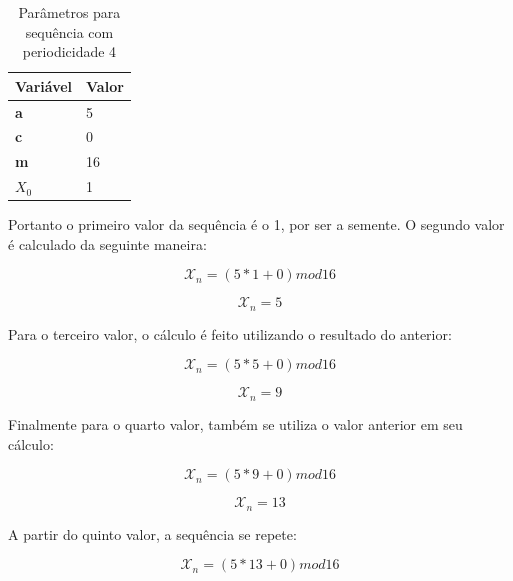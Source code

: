 \begin{table}[h]
	\centering
	\begin{tabular}{|l|l|}	
	\hline
		Variável & Valor \\ \hline
		\textbf{a} & 5 \\ \hline
		\textbf{c} & 0 \\ \hline
		\textbf{m} & 16 \\ \hline
		\textbf{$X_0$} & 1 \\ \hline
	\end{tabular}
	\caption{Parâmetros para sequência com periodicidade 4}
\end{table}

Portanto o primeiro valor da sequência é o 1, por ser a semente. O segundo valor é calculado da seguinte maneira: 

\begin{equation}
	\label{Cálculo do segundo valor}
	\mathcal{X}_n = ( 5 * 1 + 0) mod 16
\end{equation}

\begin{equation}
	\label{Resultado do segundo valor}
	\mathcal{X}_n = 5
\end{equation}

Para o terceiro valor, o cálculo é feito utilizando o resultado do anterior:

\begin{equation}
	\label{Cálculo do terceiro valor}
	\mathcal{X}_n = ( 5 * 5 + 0) mod 16
\end{equation}

\begin{equation}
	\label{Resultado do terceiro valor}
	\mathcal{X}_n = 9
\end{equation}

Finalmente para o quarto valor, também se utiliza o valor anterior em seu cálculo:

\begin{equation}
	\label{Cálculo do quarto valor}
	\mathcal{X}_n = ( 5 * 9 + 0) mod 16
\end{equation}

\begin{equation}
	\label{Resultado do quarto valor}
	\mathcal{X}_n = 13
\end{equation}

A partir do quinto valor, a sequência se repete:

\begin{equation}
	\label{Cálculo do quinto valor}
	\mathcal{X}_n = ( 5 * 13 + 0) mod 16
\end{equation}

